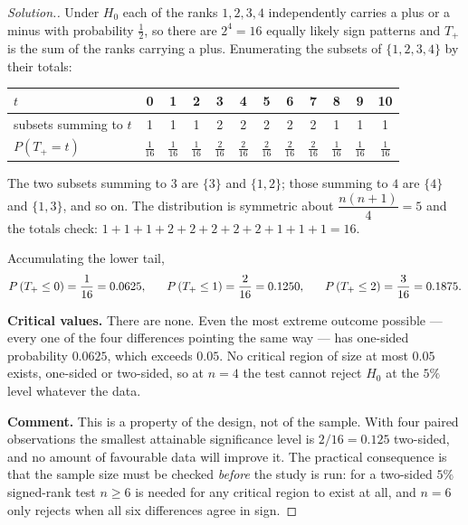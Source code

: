 \documentclass[11pt,a4paper]{article}
\theoremstyle{definition}
\newenvironment{solution}
  {\renewcommand{\qedsymbol}{}\begin{proof}[\textit{Solution}.]}
  {\end{proof}}
\begin{document}
\begin{solution}
Under $H_0$ each of the ranks $1,2,3,4$ independently carries a plus or a minus
with probability $\tfrac{1}{2}$, so there are $2^{4}=16$ equally likely sign
patterns and $T_{+}$ is the sum of the ranks carrying a plus. Enumerating the
subsets of $\{1,2,3,4\}$ by their totals:

\begin{table}[H]
\centering
\begin{tabular}{l|ccccccccccc}
$t$ &0&1&2&3&4&5&6&7&8&9&10\\
\hline
subsets summing to $t$ &1&1&1&2&2&2&2&2&1&1&1\\
$P\left(T_{+}=t\right)$ &$\frac{1}{16}$&$\frac{1}{16}$&$\frac{1}{16}$&$\frac{2}{16}$&$\frac{2}{16}$&$\frac{2}{16}$&$\frac{2}{16}$&$\frac{2}{16}$&$\frac{1}{16}$&$\frac{1}{16}$&$\frac{1}{16}$\\
\end{tabular}
\end{table}

The two subsets summing to $3$ are $\{3\}$ and $\{1,2\}$; those summing to $4$ are
$\{4\}$ and $\{1,3\}$, and so on. The distribution is symmetric about
$\dfrac{n(n+1)}{4}=5$ and the totals check: $1+1+1+2+2+2+2+2+1+1+1=16$.

Accumulating the lower tail,
$$P\left(T_{+}\leq 0\right)=\dfrac{1}{16}=0.0625,\hspace{0.6cm}
P\left(T_{+}\leq 1\right)=\dfrac{2}{16}=0.1250,\hspace{0.6cm}
P\left(T_{+}\leq 2\right)=\dfrac{3}{16}=0.1875 .$$

\textbf{Critical values.} There are none. Even the most extreme outcome
possible --- every one of the four differences pointing the same way --- has
one-sided probability $0.0625$, which exceeds $0.05$. No critical region of size
at most $0.05$ exists, one-sided or two-sided, so at $n=4$ the test cannot reject
$H_0$ at the $5\%$ level whatever the data.

\textbf{Comment.} This is a property of the design, not of the sample. With four
paired observations the smallest attainable significance level is $2/16=0.125$
two-sided, and no amount of favourable data will improve it. The practical
consequence is that the sample size must be checked \emph{before} the study is
run: for a two-sided $5\%$ signed-rank test $n\geq 6$ is needed for any critical
region to exist at all, and $n=6$ only rejects when all six differences agree in
sign.
\end{solution}
\end{document}
